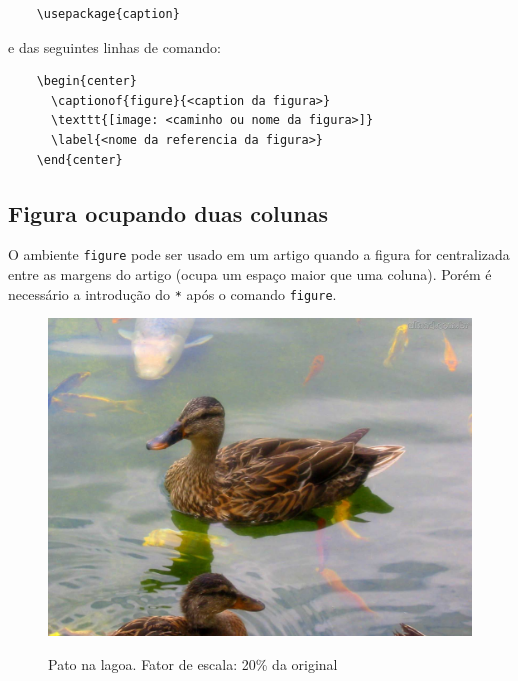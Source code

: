{\tiny
\begin{verbatim}
    \usepackage{caption}
\end{verbatim}
}

e das seguintes linhas de comando:

{\tiny
\begin{verbatim}
    \begin{center}
      \captionof{figure}{<caption da figura>} 
      \texttt{[image: <caminho ou nome da figura>]}
      \label{<nome da referencia da figura>}
    \end{center}
\end{verbatim}
}




\subsection{Figura ocupando duas colunas} 		%

O ambiente \verb+figure+ pode ser usado em um artigo quando a figura for centralizada entre as margens do artigo (ocupa um espaço maior que uma coluna). Porém é necessário a introdução do \verb+*+ após o comando \verb+figure+.

\begin{figure}
	\centering
	\caption{Pato na lagoa. Fator de escala: 20\% da original} 
	\includegraphics[scale=0.2]{./02-figuras/pato}
	\label{fig:patoB}
\end{figure}

